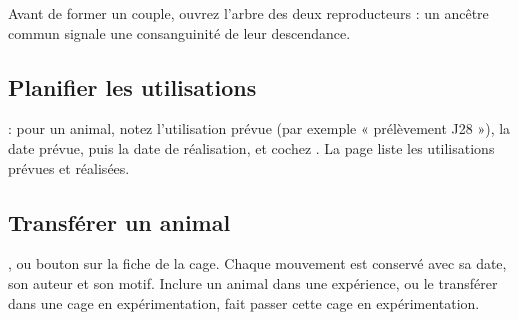\documentclass[11pt,a4paper]{article}
\begin{document}
\begin{regle}
Avant de former un couple, ouvrez l'arbre des deux reproducteurs : un ancêtre
commun signale une consanguinité de leur descendance.
\end{regle}

\subsection{Planifier les utilisations}
 : pour un animal, notez
l'utilisation prévue (par exemple « prélèvement J28 »), la date prévue, puis la
date de réalisation, et cochez . La page liste les utilisations
prévues et réalisées.

\subsection{Transférer un animal}
, ou bouton  sur
la fiche de la cage. Chaque mouvement est conservé avec sa date, son auteur
et son motif. Inclure un animal dans une expérience, ou le transférer dans
une cage en expérimentation, fait passer cette cage en expérimentation.
\end{document}
